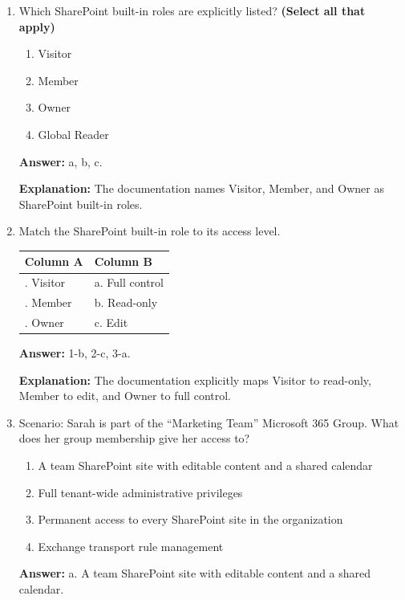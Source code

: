 \documentclass[10pt]{article}
\begin{document}
\begin{enumerate}[leftmargin=*]
\textbf{Answer:} False.

\textbf{Explanation:} The documentation specifically says these permissions aren’t tied to global administrative roles, but to specific resources.

\item Which SharePoint built-in roles are explicitly listed? \textbf{(Select all that apply)}
\begin{enumerate}[label=\alph*., leftmargin=1.5em]
\item Visitor
\item Member
\item Owner
\item Global Reader
\end{enumerate}
\textbf{Answer:} a, b, c.

\textbf{Explanation:} The documentation names Visitor, Member, and Owner as SharePoint built-in roles.

\item Match the SharePoint built-in role to its access level.

\begin{center}
\begin{tabular}{>{\raggedright\arraybackslash}p{} >{\raggedright\arraybackslash}p{}}
\toprule
\textbf{Column A} & \textbf{Column B} \\
\midrule
1. Visitor & a. Full control \\
2. Member & b. Read-only \\
3. Owner & c. Edit \\
\bottomrule
\end{tabular}
\end{center}

\textbf{Answer:} 1-b, 2-c, 3-a.

\textbf{Explanation:} The documentation explicitly maps Visitor to read-only, Member to edit, and Owner to full control.

\item Scenario: Sarah is part of the ``Marketing Team'' Microsoft 365 Group. What does her group membership give her access to?
\begin{enumerate}[label=\alph*., leftmargin=1.5em]
\item A team SharePoint site with editable content and a shared calendar
\item Full tenant-wide administrative privileges
\item Permanent access to every SharePoint site in the organization
\item Exchange transport rule management
\end{enumerate}
\textbf{Answer:} a. A team SharePoint site with editable content and a shared calendar.


\end{enumerate}
\end{document}
